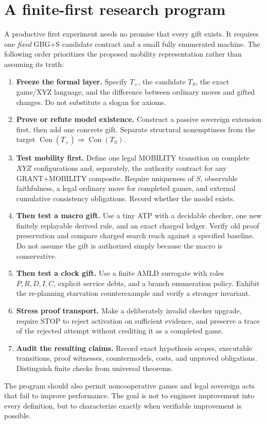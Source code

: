 \documentclass[11pt,letterpaper]{article}
\theoremstyle{remark}
\newcommand{\Con}{\operatorname{Con}}
\begin{document}
\section{A finite-first research program}
A productive first experiment needs no promise that every gift exists. It requires one \emph{fixed} GBG+S candidate contract and a small fully enumerated machine. The following order prioritizes the proposed mobility representation rather than assuming its truth:
\begin{enumerate}
\item \textbf{Freeze the formal layer.} Specify $T_+$, the candidate $T_S$, the exact game/XYZ language, and the difference between ordinary moves and gifted changes. Do not substitute a slogan for axioms.
\item \textbf{Prove or refute model existence.} Construct a passive sovereign extension first, then add one concrete gift. Separate structural nonemptiness from the target $\Con(T_+)\Rightarrow\Con(T_S)$.
\item \textbf{Test mobility first.} Define one legal MOBILITY transition on complete $XYZ$ configurations and, separately, the authority contract for any GRANT+MOBILITY composite. Require uniqueness of $S$, observable faithfulness, a legal ordinary move for completed games, and external cumulative consistency obligations. Record whether the model exists.
\item \textbf{Then test a macro gift.} Use a tiny ATP with a decidable checker, one new finitely replayable derived rule, and an exact charged ledger. Verify old proof preservation and compare charged search reach against a specified baseline. Do not assume the gift is authorized simply because the macro is conservative.
\item \textbf{Then test a clock gift.} Use a finite AMLD surrogate with roles $P,R,D,I,C$, explicit service debts, and a branch enumeration policy. Exhibit the re-planning starvation counterexample and verify a stronger invariant.
\item \textbf{Stress proof transport.} Make a deliberately invalid checker upgrade, require STOP to reject activation on sufficient evidence, and preserve a trace of the rejected attempt without crediting it as a completed game.
\item \textbf{Audit the resulting claims.} Record exact hypothesis scopes, executable transitions, proof witnesses, countermodels, costs, and unproved obligations. Distinguish finite checks from universal theorems.
\end{enumerate}
The program should also permit noncooperative games and legal sovereign acts that fail to improve performance. The goal is not to engineer improvement into every definition, but to characterize exactly when verifiable improvement is possible.
\end{document}

